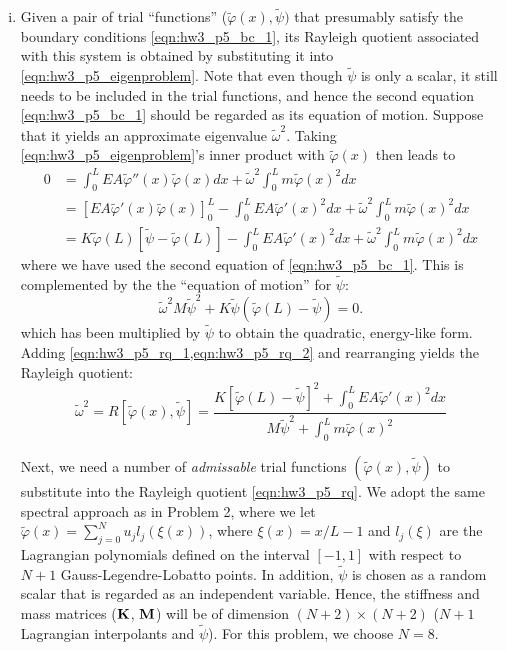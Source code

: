 \begin{enumerate}[(i)]
{}
\item {
    Given a pair of trial ``functions'' ($\tilde{\varphi}(x), \tilde{\psi})$ that presumably satisfy the boundary conditions \cref{eqn:hw3_p5_bc_1}, its Rayleigh quotient associated with this system is obtained by substituting it into \cref{eqn:hw3_p5_eigenproblem}.
    Note that even though $\tilde{\psi}$ is only a scalar, it still needs to be included in the trial functions, and hence the second equation \cref{eqn:hw3_p5_bc_1} should be regarded as its equation of motion. 
    Suppose that it yields an approximate eigenvalue $\tilde{\omega}^2$.
    Taking \cref{eqn:hw3_p5_eigenproblem}'s inner product with $\tilde{\varphi}(x)$ then leads to 
    \begin{equation}\label{eqn:hw3_p5_rq_1}
    \begin{aligned}
        0 &= \int_0^L EA \tilde{\varphi}''(x) \tilde{\varphi}(x) dx + \tilde{\omega}^2 \int_0^L m {\tilde{\varphi}(x)}^2 dx \\
        &= {\left[EA \tilde{\varphi}'(x) \tilde{\varphi}(x) \right]}_0^L - \int_0^L EA {\tilde{\varphi}'(x)}^2 dx + \tilde{\omega}^2 \int_0^L m {\tilde{\varphi}(x)}^2 dx \\
        &= K\tilde{\varphi}(L)[\tilde{\psi} - \tilde{\varphi}(L)]- \int_0^L EA {\tilde{\varphi}'(x)}^2 dx + \tilde{\omega}^2 \int_0^L m {\tilde{\varphi}(x)}^2 dx
    \end{aligned}
    \end{equation}
    where we have used the second equation of \cref{eqn:hw3_p5_bc_1}. 
    This is complemented by the the ``equation of motion'' for $\tilde{\psi}$:
    \begin{equation}\label{eqn:hw3_p5_rq_2}
        \tilde{\omega}^2 M \tilde{\psi}^2 + K\tilde{\psi}(\tilde{\varphi}(L) - \tilde{\psi}) = 0.
    \end{equation}
    which has been multiplied by $\tilde{\psi}$ to obtain the quadratic, energy-like form. 
    Adding \cref{eqn:hw3_p5_rq_1,eqn:hw3_p5_rq_2} and rearranging yields the Rayleigh quotient:
    \begin{equation}\label{eqn:hw3_p5_rq}
        \boxed{\tilde{\omega}^2 = R[\tilde{\varphi}(x), \tilde{\psi}] = \frac{K{\left[\tilde{\varphi}(L) - \tilde{\psi}\right]}^2 + \int_0^L EA {\tilde{\varphi}'(x)}^2 dx}{M \tilde{\psi}^2 + \int_0^L m {\tilde{\varphi}(x)}^2}}
    \end{equation}

    Next, we need a number of \emph{admissable} trial functions $(\tilde{\varphi}(x), \tilde{\psi})$ to substitute into the Rayleigh quotient \cref{eqn:hw3_p5_rq}.
    We adopt the same spectral approach as in Problem 2, where we let $\tilde{\varphi}(x) = \sum_{j=0}^N u_j l_j(\xi(x))$, where $\xi(x) = x/L - 1$ and $l_j(\xi)$ are the Lagrangian polynomials defined on the interval $[-1, 1]$ with respect to $N + 1$ Gauss-Legendre-Lobatto points.
    In addition, $\tilde{\psi}$ is chosen as a random scalar that is regarded as an independent variable. 
    Hence, the stiffness and mass matrices ($\mathbf{K}$, $\mathbf{M}$) will be of dimension $(N+2)\times(N+2)$ ($N+1$ Lagrangian interpolants and $\tilde{\psi}$).
    For this problem, we choose \emph{$N = 8$}. 

}
\end{enumerate}
